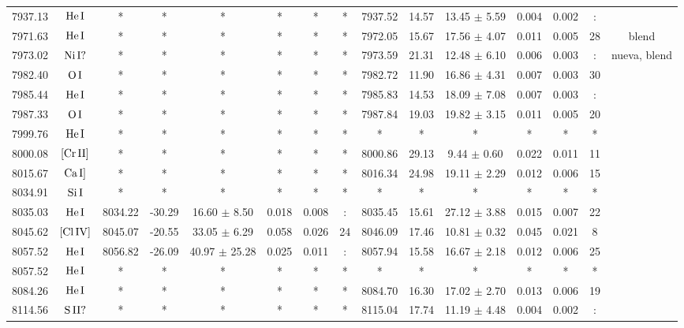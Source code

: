 \documentclass{article}
\begin{document}
\begin{table*}
\begin{adjustbox}{width=\textwidth}
\begin{tabular}{ccccccccccccccc}
7937.13 & $\mbox{He}\thinspace \mbox{I}$ & * & * & * & * & * & * & 7937.52 & 14.57 & 13.45 $\pm$ 5.59 & 0.004 & 0.002 & : &  \\
7971.63 & $\mbox{He}\thinspace \mbox{I}$ & * & * & * & * & * & * & 7972.05 & 15.67 & 17.56 $\pm$ 4.07 & 0.011 & 0.005 & 28 &  blend \\
7973.02 & $\mbox{Ni}\thinspace \mbox{I?}$ & * & * & * & * & * & * & 7973.59 & 21.31 & 12.48 $\pm$ 6.10 & 0.006 & 0.003 & : &  nueva, blend \\
7982.40 & $\mbox{O}\thinspace \mbox{I}$ & * & * & * & * & * & * & 7982.72 & 11.90 & 16.86 $\pm$ 4.31 & 0.007 & 0.003 & 30 &  \\
7985.44 & $\mbox{He}\thinspace \mbox{I}$ & * & * & * & * & * & * & 7985.83 & 14.53 & 18.09 $\pm$ 7.08 & 0.007 & 0.003 & : &  \\
7987.33 & $\mbox{O}\thinspace \mbox{I}$ & * & * & * & * & * & * & 7987.84 & 19.03 & 19.82 $\pm$ 3.15 & 0.011 & 0.005 & 20 &  \\
7999.76 & $\mbox{He}\thinspace \mbox{I}$ & * & * & * & * & * & * & * & * & * & * & * & * &  \\
8000.08 & $\mbox{[Cr}\thinspace \mbox{II]}$ & * & * & * & * & * & * & 8000.86 & 29.13 & 9.44 $\pm$ 0.60 & 0.022 & 0.011 & 11 &  \\
8015.67 & $\mbox{Ca}\thinspace \mbox{I]}$ & * & * & * & * & * & * & 8016.34 & 24.98 & 19.11 $\pm$ 2.29 & 0.012 & 0.006 & 15 &  \\
8034.91 & $\mbox{Si}\thinspace \mbox{I}$ & * & * & * & * & * & * & * & * & * & * & * & * &  \\
8035.03 & $\mbox{He}\thinspace \mbox{I}$ & 8034.22 & -30.29 & 16.60 $\pm$ 8.50 & 0.018 & 0.008 & : & 8035.45 & 15.61 & 27.12 $\pm$ 3.88 & 0.015 & 0.007 & 22 &  \\
8045.62 & $\mbox{[Cl}\thinspace \mbox{IV]}$ & 8045.07 & -20.55 & 33.05 $\pm$ 6.29 & 0.058 & 0.026 & 24 & 8046.09 & 17.46 & 10.81 $\pm$ 0.32 & 0.045 & 0.021 & 8 &  \\
8057.52 & $\mbox{He}\thinspace \mbox{I}$ & 8056.82 & -26.09 & 40.97 $\pm$ 25.28 & 0.025 & 0.011 & : & 8057.94 & 15.58 & 16.67 $\pm$ 2.18 & 0.012 & 0.006 & 25 &  \\
8057.52 & $\mbox{He}\thinspace \mbox{I}$ & * & * & * & * & * & * & * & * & * & * & * & * &  \\
8084.26 & $\mbox{He}\thinspace \mbox{I}$ & * & * & * & * & * & * & 8084.70 & 16.30 & 17.02 $\pm$ 2.70 & 0.013 & 0.006 & 19 &  \\
8114.56 & $\mbox{S}\thinspace \mbox{II?}$ & * & * & * & * & * & * & 8115.04 & 17.74 & 11.19 $\pm$ 4.48 & 0.004 & 0.002 & : &  \\

\end{tabular}
\end{adjustbox}
\end{table*}
\end{document}
